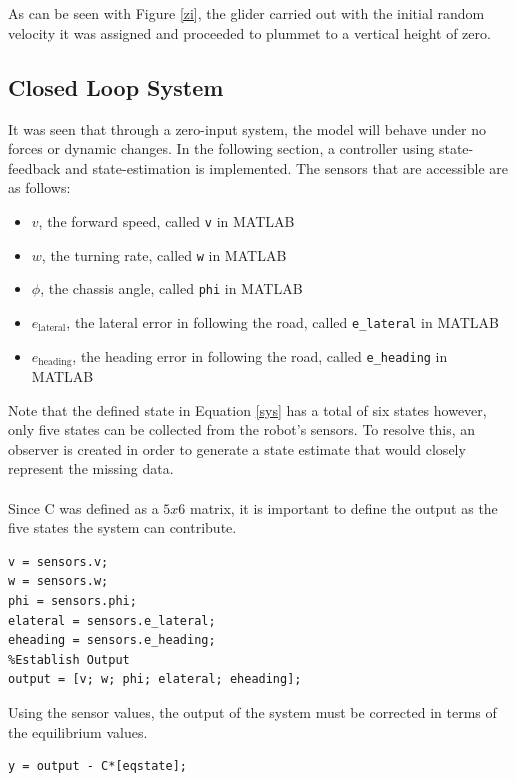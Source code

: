 \documentclass[12pt]{article}
\begin{document}
\\ \\
As can be seen with Figure \ref{zi}, the glider carried out with the initial random velocity it was assigned and proceeded to plummet to a vertical height of zero.
\subsection{Closed Loop System}
It was seen that through a zero-input system, the model will behave under no forces or dynamic changes. In the following section, a controller using state-feedback and state-estimation is implemented. The sensors that are accessible are as follows:
\begin{itemize}
\item $v$, the forward speed, called \lstinline|v| in MATLAB
\item $w$, the turning rate, called \lstinline|w| in MATLAB
\item $\phi$, the chassis angle, called \lstinline|phi| in MATLAB
\item $e_\text{lateral}$, the lateral error in following the road, called \lstinline|e_lateral| in MATLAB
\item $e_\text{heading}$, the heading error in following the road, called \lstinline|e_heading| in MATLAB
\end{itemize}
Note that the defined state in Equation \eqref{sys} has a total of six states however, only five states can be collected from the robot's sensors. To resolve this, an observer is created in order to generate a state estimate that would closely represent the missing data. 
\\ \\
Since C was defined as a $5x6$ matrix, it is important to define the output as the five states the system can contribute.
\begin{lstlisting}[frame=single]
%Define Sensor Values
v = sensors.v;
w = sensors.w;
phi = sensors.phi;
elateral = sensors.e_lateral;
eheading = sensors.e_heading;
%Establish Output
output = [v; w; phi; elateral; eheading];
\end{lstlisting}
Using the sensor values, the output of the system must be corrected in terms of the equilibrium values.
\begin{lstlisting}[frame=single]
%WHAT?
y = output - C*[eqstate];
\end{lstlisting}
\end{document}
